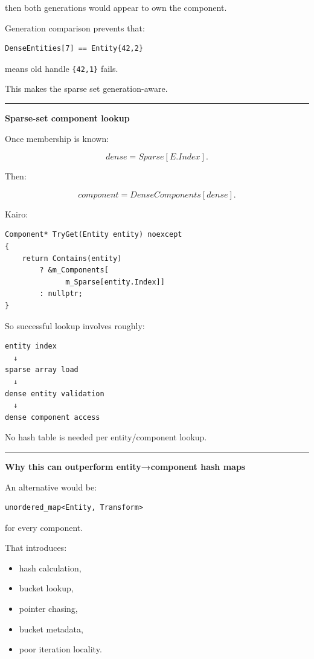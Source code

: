 then both generations would appear to own the component.

Generation comparison prevents that:

\begin{verbatim}
DenseEntities[7] == Entity{42,2}
\end{verbatim}

means old handle \texttt{\{42,1\}} fails.

This makes the sparse set generation-aware.

\begin{center}\rule{0.5\linewidth}{0.5pt}\end{center}

\textbf{Sparse-set component lookup}

Once membership is known:

\[
dense=Sparse[E.Index].
\]

Then:

\[
component=DenseComponents[dense].
\]

Kairo:

\begin{verbatim}
Component* TryGet(Entity entity) noexcept
{
    return Contains(entity)
        ? &m_Components[
              m_Sparse[entity.Index]]
        : nullptr;
}
\end{verbatim}

So successful lookup involves roughly:

\begin{verbatim}
entity index
  ↓
sparse array load
  ↓
dense entity validation
  ↓
dense component access
\end{verbatim}

No hash table is needed per entity/component lookup.

\begin{center}\rule{0.5\linewidth}{0.5pt}\end{center}

\textbf{Why this can outperform entity→component hash maps}

An alternative would be:

\begin{verbatim}
unordered_map<Entity, Transform>
\end{verbatim}

for every component.

That introduces:

\begin{itemize}
\tightlist
\item
  hash calculation,
\item
  bucket lookup,
\item
  pointer chasing,
\item
  bucket metadata,
\item
  poor iteration locality.
\end{itemize}

